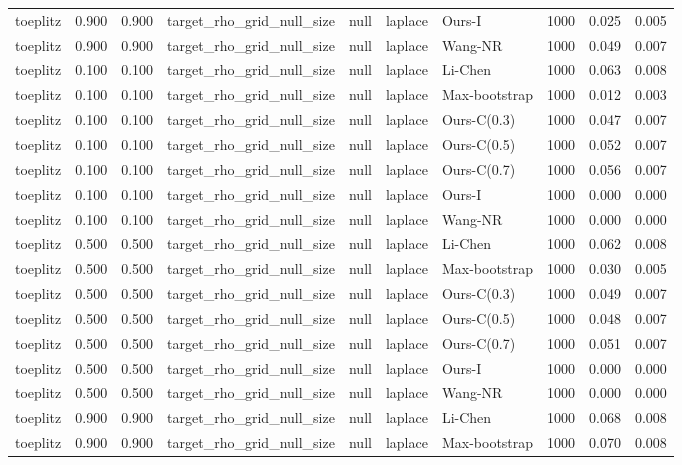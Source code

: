 \begin{tabular}{lrrllllrrr}
toeplitz & 0.900 & 0.900 & target\_rho\_grid\_null\_size & null & laplace & Ours-I & 1000 & 0.025 & 0.005 \\
toeplitz & 0.900 & 0.900 & target\_rho\_grid\_null\_size & null & laplace & Wang-NR & 1000 & 0.049 & 0.007 \\
toeplitz & 0.100 & 0.100 & target\_rho\_grid\_null\_size & null & laplace & Li-Chen & 1000 & 0.063 & 0.008 \\
toeplitz & 0.100 & 0.100 & target\_rho\_grid\_null\_size & null & laplace & Max-bootstrap & 1000 & 0.012 & 0.003 \\
toeplitz & 0.100 & 0.100 & target\_rho\_grid\_null\_size & null & laplace & Ours-C(0.3) & 1000 & 0.047 & 0.007 \\
toeplitz & 0.100 & 0.100 & target\_rho\_grid\_null\_size & null & laplace & Ours-C(0.5) & 1000 & 0.052 & 0.007 \\
toeplitz & 0.100 & 0.100 & target\_rho\_grid\_null\_size & null & laplace & Ours-C(0.7) & 1000 & 0.056 & 0.007 \\
toeplitz & 0.100 & 0.100 & target\_rho\_grid\_null\_size & null & laplace & Ours-I & 1000 & 0.000 & 0.000 \\
toeplitz & 0.100 & 0.100 & target\_rho\_grid\_null\_size & null & laplace & Wang-NR & 1000 & 0.000 & 0.000 \\
toeplitz & 0.500 & 0.500 & target\_rho\_grid\_null\_size & null & laplace & Li-Chen & 1000 & 0.062 & 0.008 \\
toeplitz & 0.500 & 0.500 & target\_rho\_grid\_null\_size & null & laplace & Max-bootstrap & 1000 & 0.030 & 0.005 \\
toeplitz & 0.500 & 0.500 & target\_rho\_grid\_null\_size & null & laplace & Ours-C(0.3) & 1000 & 0.049 & 0.007 \\
toeplitz & 0.500 & 0.500 & target\_rho\_grid\_null\_size & null & laplace & Ours-C(0.5) & 1000 & 0.048 & 0.007 \\
toeplitz & 0.500 & 0.500 & target\_rho\_grid\_null\_size & null & laplace & Ours-C(0.7) & 1000 & 0.051 & 0.007 \\
toeplitz & 0.500 & 0.500 & target\_rho\_grid\_null\_size & null & laplace & Ours-I & 1000 & 0.000 & 0.000 \\
toeplitz & 0.500 & 0.500 & target\_rho\_grid\_null\_size & null & laplace & Wang-NR & 1000 & 0.000 & 0.000 \\
toeplitz & 0.900 & 0.900 & target\_rho\_grid\_null\_size & null & laplace & Li-Chen & 1000 & 0.068 & 0.008 \\
toeplitz & 0.900 & 0.900 & target\_rho\_grid\_null\_size & null & laplace & Max-bootstrap & 1000 & 0.070 & 0.008 \\

\end{tabular}
